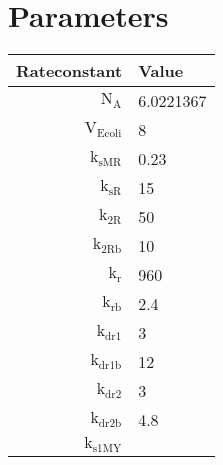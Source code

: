 \documentclass[11pt]{article}
\begin{document}
\section{Parameters}
\begin{table}
    \centering
    \begin{tabular}{r|l}
    Rateconstant & Value \\
    \hline
            $ 
            \text{N}_{\text{A}} 
            $
               &
            $ 
            $6.0221367$ 
            $
        \\
            $ 
            \text{V}_{\text{Ecoli}} 
            $
               &
            $ 
            $8$ 
            $
        \\
            $ 
            \text{k}_{\text{sMR}} 
            $
               &
            $ 
            $0.23$ 
            $
        \\
            $ 
            \text{k}_{\text{sR}} 
            $
               &
            $ 
            $15$ 
            $
        \\
            $ 
            \text{k}_{\text{2R}} 
            $
               &
            $ 
            $50$ 
            $
        \\
            $ 
            \text{k}_{\text{2Rb}} 
            $
               &
            $ 
            $10$ 
            $
        \\
            $ 
            \text{k}_{\text{r}} 
            $
               &
            $ 
            $960$ 
            $
        \\
            $ 
            \text{k}_{\text{rb}} 
            $
               &
            $ 
            $2.4$ 
            $
        \\
            $ 
            \text{k}_{\text{dr1}} 
            $
               &
            $ 
            $3$ 
            $
        \\
            $ 
            \text{k}_{\text{dr1b}} 
            $
               &
            $ 
            $12$ 
            $
        \\
            $ 
            \text{k}_{\text{dr2}} 
            $
               &
            $ 
            $3$ 
            $
        \\
            $ 
            \text{k}_{\text{dr2b}} 
            $
               &
            $ 
            $4.8$ 
            $
        \\
            $ 
            \text{k}_{\text{s1MY}} 
            $

\end{tabular}
\end{table}
\end{document}
